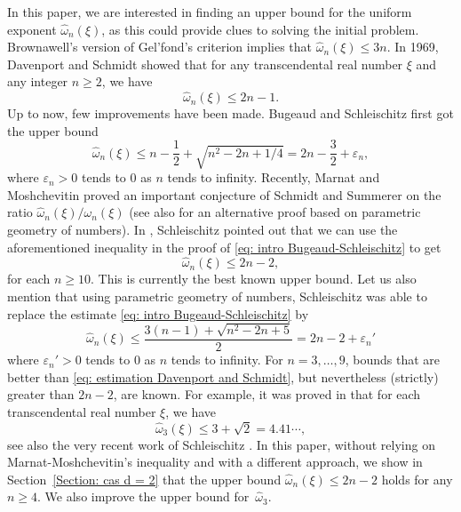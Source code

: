 \documentclass[JEP,XML,SOM,Unicode,NoFloatCountersInSection,published]{cedram}
\newcommand\ee{\varepsilon}
\newcommand\homega{\widehat{\omega}}\newcommand\HH{\mathcal{H}}
\theoremstyle{definition}
\theoremstyle{plain}
\begin{document}
In this paper, we are interested in finding an upper bound for the uniform exponent $\homega_n(\xi)$, as this could provide clues to solving the initial problem. Brownawell's version of Gel'fond's criterion \cite{brownawell1974sequences} implies that $\homega_n(\xi) \leq 3n$. In 1969, Davenport and Schmidt \cite[Th.\,2b]{davenport1969approximation} showed that for any transcendental real number $\xi$ and any integer $n\geq 2$, we have
\begin{equation}
\label{eq: estimation Davenport and Schmidt}
\homega_n(\xi)\leq 2n-1.
\end{equation}
Up to now, few improvements have been made. Bugeaud and Schleischitz \cite[Th.\,2.1]{bugeaudSchleischitz2016Uniform} first got the upper bound
\begin{equation}
\label{eq: intro Bugeaud-Schleischitz}
\homega_n(\xi) \leq n-\frac{1}{2} + \sqrt{n^2-2n+1/4} = 2n-\frac{3}{2}+ \ee_n,
\end{equation}
where $\ee_n>0$ tends to $0$ as $n$ tends to infinity. Recently, Marnat and Moshchevitin \cite{marnat2018optimal} proved an important conjecture of Schmidt and Summerer on the ratio $\homega_n(\xi)/\omega_n(\xi)$ (see also \cite[Ch.\,2]{PhDMartin2019} for an alternative proof based on parametric geometry of numbers). In \cite{schleischitz2017some}, Schleischitz pointed out that we can use the aforementioned inequality in the proof of \eqref{eq: intro Bugeaud-Schleischitz} to get
\[
\homega_n(\xi) \leq 2n-2,
\]
for each $n\geq 10$. This is currently the best known upper bound. Let us also mention that using parametric geometry of numbers, Schleischitz \cite[Th.\,1.1]{schleischitz2017uniformPoly} was able to replace the estimate \eqref{eq: intro Bugeaud-Schleischitz} by
\begin{equation*}
\homega_n(\xi) \leq \frac{3(n-1)+\sqrt{n^2-2n+5}}{2} = 2n-2+ \ee_n'
\end{equation*}
where $\ee_n' > 0$ tends to $0$ as $n$ tends to infinity. For $n=3,\dots,9$, bounds that are better than \eqref{eq: estimation Davenport and Schmidt}, but nevertheless (strictly) greater than $2n-2$, are known. For example, it was proved in \cite{bugeaudSchleischitz2016Uniform} that for each transcendental real number $\xi$, we have
\[
\homega_3(\xi)\leq 3+\sqrt 2 = 4.41\cdots,
\]
see also the very recent work of Schleischitz \cite{schleischitz2024uniform}. In this paper, without relying on Marnat-Moshchevitin's inequality and with a different approach, we show in Section~\ref{Section: cas d = 2} that the upper bound $\homega_n(\xi)\leq 2n-2$ holds for any $n\geq 4$. We also improve the upper bound for~$\homega_3$.
\end{document}
